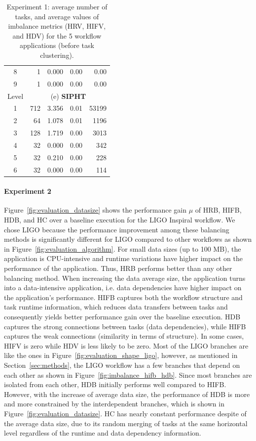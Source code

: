 \begin{table}[!htb]
\begin{tabular}{c|r|r|r|r}
		8 &1 & 0.000 & 0.00 & 0.00 \\
		9 & 1 & 0.000 & 0.00 & 0.00 \\
		\hline		
		Level & \multicolumn{4}{c}{(e) \textbf{SIPHT}} \\
		\hline
		1 & 712 & 3.356 & 0.01 & 53199 \\
		2 & 64 & 1.078 & 0.01 & 1196 \\
		3 & 128 & 1.719 & 0.00 & 3013 \\
		4 & 32 & 0.000 & 0.00 & 342 \\
		5 & 32 & 0.210 & 0.00 & 228\\
		6& 32 & 0.000 & 0.00 & 114\\
	\end{tabular}
	\caption{Experiment 1: average number of tasks, and average values of imbalance metrics (HRV, HIFV, and HDV) for the 5 workflow applications (before task clustering).}
	\label{tab:evaluation_montage}
\end{table} 


\paragraph{\textbf{Experiment 2}} 
Figure~\ref{fig:evaluation_datasize} shows the performance gain $\mu$ of HRB, HIFB, HDB, and HC over a baseline execution for the LIGO Inspiral workflow. We chose LIGO because the performance improvement among these balancing methods is significantly different for LIGO compared to other workflows as shown in Figure~\ref{fig:evaluation_algorithm}. For small data sizes (up to 100 MB), the application is CPU-intensive and runtime variations have higher impact on the performance of the application. Thus, HRB performs better than any other balancing method. When increasing the data average size, the application turns into a data-intensive application, i.e. data dependencies have higher impact on the application's performance. HIFB captures both the workflow structure and task runtime information, which reduces data transfers between tasks and consequently yields better performance gain over the baseline execution. HDB captures the strong connections between tasks (data dependencies), while HIFB captures the weak connections (similarity in terms of structure). In some cases, HIFV is zero while HDV is less likely to be zero.
Most of the LIGO branches are like the ones in Figure~\ref{fig:evaluation_shape_ligo}, however, as mentioned in Section~\ref{sec:methods}, the LIGO workflow has a few branches that depend on each other as shown in Figure~\ref{fig:imbalance_hifb_hdb}. Since most branches are isolated from each other, HDB initially performs well compared to HIFB. However, with the increase of average data size, the performance of HDB is more and more constrained by the interdependent branches, which is shown in Figure~\ref{fig:evaluation_datasize}.  
HC has nearly constant performance despite of the average data size, due to its random merging of tasks at the same horizontal level regardless of the runtime and data dependency information.

